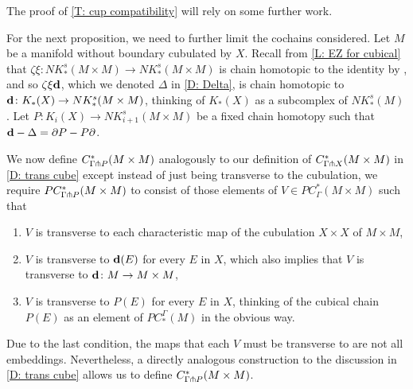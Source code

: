 \documentclass{amsart}
\begin{document}
The proof of \cref{T: cup compatibility} will rely on some further work.

For the next proposition, we need to further limit the cochains considered.
Let $M$ be a manifold without boundary cubulated by $X$.
Recall from \cref{L: EZ for cubical} that $\zeta \xi \colon NK^s_*(M \times M) \to  NK^s_*(M \times M)$ is chain homotopic to the identity by \cite[Section XI.5]{Mas91}, and so $\zeta\xi \mathbf{d}$, which we denoted $\Delta$ in \cref{D: Delta}, is chain homotopic to $\mathbf{d} \colon K_*(X) \to NK^s_*(M \times M)$, thinking of $K_*(X)$ as a subcomplex of $NK_*^s(M)$.
Let $P \colon K_i(X) \to NK^s_{i+1}(M \times M)$ be a fixed chain homotopy such that $\mathbf{d} - \Delta = \partial P - P \partial$.

We now define $C^*_{\Gamma \pitchfork P} (M \times M)$ analogously to our definition of $C^*_{\Gamma \pitchfork X}(M \times M)$ in \cref{D: trans cube} except instead of just being transverse to the cubulation, we require
$PC^*_{\Gamma \pitchfork P} (M \times M)$ to consist of those elements of $V \in PC^*_{\Gamma}(M \times M)$ such that
\begin{enumerate}
\item $V$ is transverse to each characteristic map of the cubulation $X \times X$ of $M \times M$,
\item $V$ is transverse to $\mathbf{d}(E)$ for every $E$ in $X$, which also implies that $V$ is transverse to $\mathbf{d} \colon M \to M \times M$,
\item $V$ is transverse to $P(E)$ for every $E$ in $X$, thinking of the cubical chain $P(E)$ as an element of $PC^\Gamma_*(M)$ in the obvious way.
\end{enumerate}

Due to the last condition, the maps that each $V$ must be transverse to are not all embeddings.
Nevertheless, a directly analogous construction to the discussion in \cref{D: trans cube} allows us to define $C^*_{\Gamma \pitchfork P} (M \times M)$.
\end{document}
